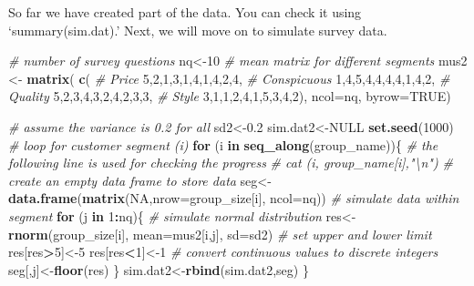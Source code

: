 \documentclass[
]{article}
\newenvironment{Shaded}{\begin{snugshade}}{\end{snugshade}}
\newcommand{\CommentTok}[1]{\textcolor[rgb]{0.56,0.35,0.01}{\textit{#1}}}
\newcommand{\ControlFlowTok}[1]{\textcolor[rgb]{0.13,0.29,0.53}{\textbf{#1}}}
\newcommand{\DataTypeTok}[1]{\textcolor[rgb]{0.13,0.29,0.53}{#1}}
\newcommand{\DecValTok}[1]{\textcolor[rgb]{0.00,0.00,0.81}{#1}}
\newcommand{\FloatTok}[1]{\textcolor[rgb]{0.00,0.00,0.81}{#1}}
\newcommand{\KeywordTok}[1]{\textcolor[rgb]{0.13,0.29,0.53}{\textbf{#1}}}
\newcommand{\NormalTok}[1]{#1}
\newcommand{\OperatorTok}[1]{\textcolor[rgb]{0.81,0.36,0.00}{\textbf{#1}}}
\newcommand{\OtherTok}[1]{\textcolor[rgb]{0.56,0.35,0.01}{#1}}
\newcommand{\StringTok}[1]{\textcolor[rgb]{0.31,0.60,0.02}{#1}}
\begin{document}
So far we have created part of the data. You can check it using
`summary(sim.dat).' Next, we will move on to simulate survey data.

\begin{Shaded}
\begin{Highlighting}[]
\CommentTok{# number of survey questions}
\NormalTok{nq<-}\DecValTok{10}
\CommentTok{# mean matrix for different segments }
\NormalTok{mus2 <-}\StringTok{ }\KeywordTok{matrix}\NormalTok{( }\KeywordTok{c}\NormalTok{(}
  \CommentTok{# Price}
 \DecValTok{5}\NormalTok{,}\DecValTok{2}\NormalTok{,}\DecValTok{1}\NormalTok{,}\DecValTok{3}\NormalTok{,}\DecValTok{1}\NormalTok{,}\DecValTok{4}\NormalTok{,}\DecValTok{1}\NormalTok{,}\DecValTok{4}\NormalTok{,}\DecValTok{2}\NormalTok{,}\DecValTok{4}\NormalTok{,}
  \CommentTok{# Conspicuous}
 \DecValTok{1}\NormalTok{,}\DecValTok{4}\NormalTok{,}\DecValTok{5}\NormalTok{,}\DecValTok{4}\NormalTok{,}\DecValTok{4}\NormalTok{,}\DecValTok{4}\NormalTok{,}\DecValTok{4}\NormalTok{,}\DecValTok{1}\NormalTok{,}\DecValTok{4}\NormalTok{,}\DecValTok{2}\NormalTok{,}
  \CommentTok{# Quality}
 \DecValTok{5}\NormalTok{,}\DecValTok{2}\NormalTok{,}\DecValTok{3}\NormalTok{,}\DecValTok{4}\NormalTok{,}\DecValTok{3}\NormalTok{,}\DecValTok{2}\NormalTok{,}\DecValTok{4}\NormalTok{,}\DecValTok{2}\NormalTok{,}\DecValTok{3}\NormalTok{,}\DecValTok{3}\NormalTok{,}
  \CommentTok{# Style}
 \DecValTok{3}\NormalTok{,}\DecValTok{1}\NormalTok{,}\DecValTok{1}\NormalTok{,}\DecValTok{2}\NormalTok{,}\DecValTok{4}\NormalTok{,}\DecValTok{1}\NormalTok{,}\DecValTok{5}\NormalTok{,}\DecValTok{3}\NormalTok{,}\DecValTok{4}\NormalTok{,}\DecValTok{2}\NormalTok{), }\DataTypeTok{ncol=}\NormalTok{nq, }\DataTypeTok{byrow=}\OtherTok{TRUE}\NormalTok{)}

\CommentTok{# assume the variance is 0.2 for all}
\NormalTok{sd2<-}\FloatTok{0.2}
\NormalTok{sim.dat2<-}\OtherTok{NULL}
\KeywordTok{set.seed}\NormalTok{(}\DecValTok{1000}\NormalTok{)}
\CommentTok{# loop for customer segment (i)}
\ControlFlowTok{for}\NormalTok{ (i }\ControlFlowTok{in} \KeywordTok{seq_along}\NormalTok{(group_name))\{}
  \CommentTok{# the following line is used for checking the progress}
  \CommentTok{# cat (i, group_name[i],"\textbackslash{}n")}
  \CommentTok{# create an empty data frame to store data}
\NormalTok{  seg<-}\KeywordTok{data.frame}\NormalTok{(}\KeywordTok{matrix}\NormalTok{(}\OtherTok{NA}\NormalTok{,}\DataTypeTok{nrow=}\NormalTok{group_size[i], }\DataTypeTok{ncol=}\NormalTok{nq))  }
  \CommentTok{# simulate data within segment}
  \ControlFlowTok{for}\NormalTok{ (j }\ControlFlowTok{in} \DecValTok{1}\OperatorTok{:}\NormalTok{nq)\{}
    \CommentTok{# simulate normal distribution}
\NormalTok{    res<-}\KeywordTok{rnorm}\NormalTok{(group_size[i], }\DataTypeTok{mean=}\NormalTok{mus2[i,j], }\DataTypeTok{sd=}\NormalTok{sd2)}
    \CommentTok{# set upper and lower limit}
\NormalTok{    res[res}\OperatorTok{>}\DecValTok{5}\NormalTok{]<-}\DecValTok{5}
\NormalTok{    res[res}\OperatorTok{<}\DecValTok{1}\NormalTok{]<-}\DecValTok{1}
    \CommentTok{# convert continuous values to discrete integers}
\NormalTok{    seg[,j]<-}\KeywordTok{floor}\NormalTok{(res)}
\NormalTok{  \}}
\NormalTok{  sim.dat2<-}\KeywordTok{rbind}\NormalTok{(sim.dat2,seg)}
\NormalTok{\}}


\end{Highlighting}
\end{Shaded}
\end{document}
